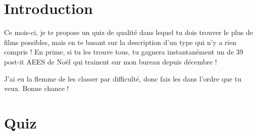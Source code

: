 \hypertarget{introduction}{%
\section{Introduction}\label{introduction}}

Ce mois-ci, je te propose un quiz de qualité dans lequel tu dois trouver
le plus de films possibles, mais en te basant sur la description d'un
type qui n'y a rien compris ! En prime, si tu les trouve tous, tu
gagnera instantanément un de 39 post-it AEES de Noël qui trainent sur
mon bureau depuis décembre !

J'ai eu la flemme de les classer par difficulté, donc fais les dans
l'ordre que tu veux. Bonne chance !

\hypertarget{quiz}{%
\section{Quiz}\label{quiz}}

